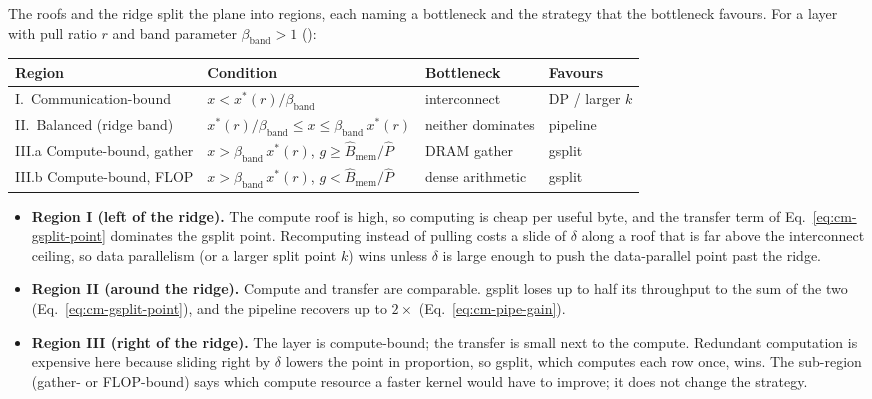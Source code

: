 The roofs and the ridge split the plane into regions, each naming a bottleneck and the strategy
that the bottleneck favours. For a layer with pull ratio $r$ and band parameter
$\beta_{\mathrm{band}} > 1$ (\placeholder):
\begin{center}
\footnotesize
\begin{tabular}{l l l l}
\toprule
Region & Condition & Bottleneck & Favours \\
\midrule
I.\ Communication-bound & $x < x^{*}(r)/\beta_{\mathrm{band}}$
   & interconnect & DP / larger $k$ \\
II.\ Balanced (ridge band) & $x^{*}(r)/\beta_{\mathrm{band}} \le x \le \beta_{\mathrm{band}}\, x^{*}(r)$
   & neither dominates & pipeline \\
III.a Compute-bound, gather & $x > \beta_{\mathrm{band}}\, x^{*}(r)$, $g \ge \hat{B}_{\mathrm{mem}}/\hat{P}$
   & DRAM gather & gsplit \\
III.b Compute-bound, FLOP & $x > \beta_{\mathrm{band}}\, x^{*}(r)$, $g < \hat{B}_{\mathrm{mem}}/\hat{P}$
   & dense arithmetic & gsplit \\
\bottomrule
\end{tabular}
\end{center}

\begin{itemize}\itemsep2pt
  \item \textbf{Region I (left of the ridge).} The compute roof is high, so computing is cheap per
        useful byte, and the transfer term of Eq.~\eqref{eq:cm-gsplit-point} dominates the gsplit
        point. Recomputing instead of pulling costs a slide of $\delta$ along a roof that is far
        above the interconnect ceiling, so data parallelism (or a larger split point $k$) wins
        unless $\delta$ is large enough to push the data-parallel point past the ridge.
  \item \textbf{Region II (around the ridge).} Compute and transfer are comparable. gsplit loses up
        to half its throughput to the sum of the two (Eq.~\eqref{eq:cm-gsplit-point}), and the
        pipeline recovers up to $2\times$ (Eq.~\eqref{eq:cm-pipe-gain}).
  \item \textbf{Region III (right of the ridge).} The layer is compute-bound; the transfer is small
        next to the compute. Redundant computation is expensive here because sliding right by
        $\delta$ lowers the point in proportion, so gsplit, which computes each row once, wins.
        The sub-region (gather- or FLOP-bound) says which compute resource a faster kernel would
        have to improve; it does not change the strategy.
\end{itemize}

